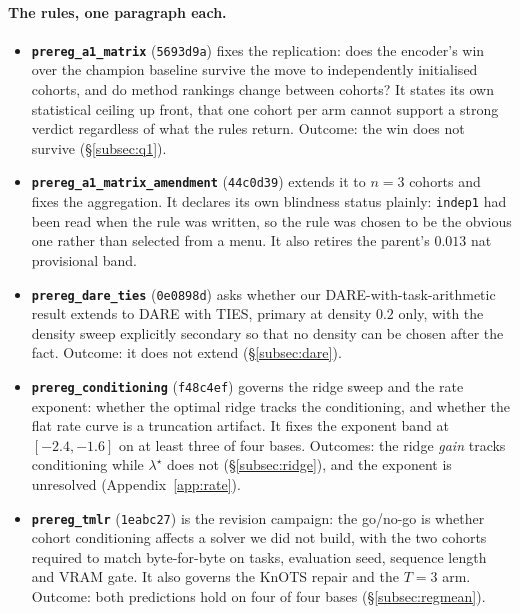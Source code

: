 \paragraph{The rules, one paragraph each.}
\begin{itemize}\itemsep2pt
\item \textbf{\texttt{prereg\_a1\_matrix}} (\texttt{5693d9a}) fixes the
replication: does the encoder's win over the champion baseline survive the
move to independently initialised cohorts, and do method rankings change
between cohorts? It states its own statistical ceiling up front, that one
cohort per arm cannot support a strong verdict regardless of what the rules
return. Outcome: the win does not survive (\S\ref{subsec:q1}).

\item \textbf{\texttt{prereg\_a1\_matrix\_amendment}} (\texttt{44c0d39})
extends it to $n = 3$ cohorts and fixes the aggregation. It declares its
own blindness status plainly: \texttt{indep1} had been read when the rule
was written, so the rule was chosen to be the obvious one rather than
selected from a menu. It also retires the parent's $0.013$ nat provisional
band.

\item \textbf{\texttt{prereg\_dare\_ties}} (\texttt{0e0898d}) asks whether
our DARE-with-task-arithmetic result extends to DARE with TIES, primary at
density $0.2$ only, with the density sweep explicitly secondary so that no
density can be chosen after the fact. Outcome: it does not extend
(\S\ref{subsec:dare}).

\item \textbf{\texttt{prereg\_conditioning}} (\texttt{f48c4ef}) governs the
ridge sweep and the rate exponent: whether the optimal ridge tracks the
conditioning, and whether the flat rate curve is a truncation artifact. It
fixes the exponent band at $[-2.4, -1.6]$ on at least three of four bases.
Outcomes: the ridge \emph{gain} tracks conditioning while $\lambda^\star$
does not (\S\ref{subsec:ridge}), and the exponent is unresolved
(Appendix~\ref{app:rate}).

\item \textbf{\texttt{prereg\_tmlr}} (\texttt{1eabc27}) is the revision
campaign: the go/no-go is whether cohort conditioning affects a solver we
did not build, with the two cohorts required to match byte-for-byte on
tasks, evaluation seed, sequence length and VRAM gate. It also governs the
KnOTS repair and the $T = 3$ arm. Outcome: both predictions hold on four of
four bases (\S\ref{subsec:regmean}).


\end{itemize}
